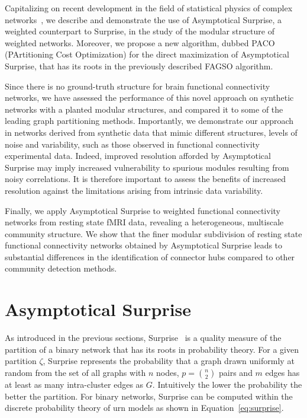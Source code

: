 Capitalizing on recent development in the field of statistical physics of complex networks~\cite{traag2015}, we describe and demonstrate the use of Asymptotical Surprise, a weighted counterpart to Surprise, in the study of the modular structure of weighted networks.
Moreover, we propose a new algorithm, dubbed PACO (PArtitioning Cost Optimization) for the direct maximization of Asymptotical Surprise, that has its roots in the previously described FAGSO algorithm.

Since there is no ground-truth structure for brain functional connectivity networks, we have assessed the performance of this novel approach on synthetic networks with a planted modular structures, and compared it to some of the leading graph partitioning methods.
Importantly, we demonstrate our approach in networks  derived from synthetic data that mimic different structures, levels of noise and variability, such as those observed in functional connectivity experimental data.
Indeed, improved resolution afforded by Asymptotical Surprise may imply increased vulnerability to spurious modules resulting from noisy correlations.
It is therefore important to assess the benefits of increased resolution against the limitations arising from intrinsic data variability. 

Finally, we apply Asymptotical Surprise to weighted functional connectivity networks from resting state fMRI data, revealing a heterogeneous, multiscale community structure. We show that the finer modular subdivision of resting state functional connectivity networks obtained by Asymptotical Surprise leads to substantial differences in the identification of connector hubs compared to other community detection methods.

\section{Asymptotical Surprise}
As introduced in the previous sections, Surprise~\cite{aldecoa2011,aldecoa2013} is a quality measure of the partition of a binary network that has its roots in probability theory.
For a given partition $\zeta$, Surprise represents the probability that a graph drawn uniformly at random from the set of all graphs with $n$ nodes, $p=\binom{n}{2}$ pairs and $m$ edges has at least as many intra-cluster edges as $G$. Intuitively the lower the probability the better the partition.  For binary networks, Surprise can be computed within the discrete probability theory of urn models as shown in Equation~\ref{eq:surprise}.


